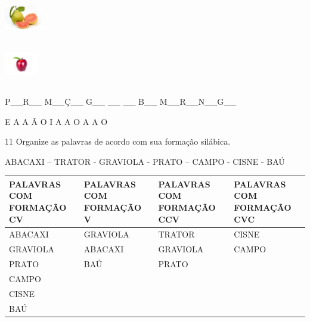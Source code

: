 \includegraphics[width=0.64462in,height=0.50955in]{media/image75.jpeg}

\includegraphics[width=0.58584in,height=0.73807in]{media/image76.jpeg}

P\_\_R\_\_ M\_\_Ç\_\_ G\_\_ \_\_ \_\_ B\_\_ M\_\_R\_\_N\_\_G\_\_

E A A Ã O I A A O A A O


\num{11} Organize as palavras de acordo com sua formação silábica.


ABACAXI -- TRATOR - GRAVIOLA - PRATO -- CAMPO - CISNE - BAÚ

\begin{longtable}[]{@{}llll@{}}
\toprule
\textbf{PALAVRAS COM FORMAÇÃO CV} & \textbf{PALAVRAS COM FORMAÇÃO V} &
\textbf{PALAVRAS COM FORMAÇÃO CCV} & \textbf{PALAVRAS COM FORMAÇÃO
CVC}\tabularnewline
\midrule
\endhead
ABACAXI & GRAVIOLA & TRATOR & CISNE\tabularnewline
GRAVIOLA & ABACAXI & GRAVIOLA & CAMPO\tabularnewline
PRATO & BAÚ & PRATO &\tabularnewline
CAMPO & & &\tabularnewline
CISNE & & &\tabularnewline
BAÚ & & &\tabularnewline
\bottomrule
\end{longtable}

